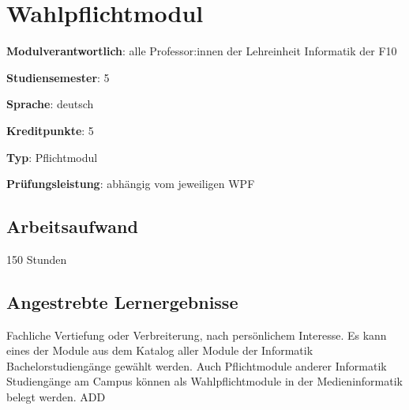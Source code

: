 \hypertarget{wahlpflichtmodulpathlabelmi-2017modulbeschreibungen-bachelorba_wpf}{%
\chapter{Wahlpflichtmodul\label{/mi-2017/modulbeschreibungen-bachelor/BA_WPF}}\label{wahlpflichtmodulpathlabelmi-2017modulbeschreibungen-bachelorba_wpf}}

\begin{modulHead}
\textbf{Modulverantwortlich}: alle Professor:innen
der Lehreinheit Informatik der
F10
\end{modulHead}
\begin{modulHead}
\textbf{Studiensemester}:
5
\end{modulHead}
\begin{modulHead}
\textbf{Sprache}:
deutsch
\end{modulHead}
\begin{modulHead}
\textbf{Kreditpunkte}:
5
\end{modulHead}
\begin{modulHead}
\textbf{Typ}:
Pflichtmodul
\end{modulHead}
\begin{modulHead}
\textbf{Prüfungsleistung}:
abhängig vom jeweiligen WPF
\end{modulHead}


\hypertarget{arbeitsaufwandpathlabelmi-2017modulbeschreibungen-bachelorba_wpf}{%
\section*{Arbeitsaufwand\label{/mi-2017/modulbeschreibungen-bachelor/BA_WPF}}\label{arbeitsaufwandpathlabelmi-2017modulbeschreibungen-bachelorba_wpf}}

150 Stunden

\hypertarget{angestrebte-lernergebnissepathlabelmi-2017modulbeschreibungen-bachelorba_wpf}{%
\section*{Angestrebte
Lernergebnisse\label{/mi-2017/modulbeschreibungen-bachelor/BA_WPF}}\label{angestrebte-lernergebnissepathlabelmi-2017modulbeschreibungen-bachelorba_wpf}}

Fachliche Vertiefung oder Verbreiterung, nach persönlichem Interesse. Es
kann eines der Module aus dem Katalog aller Module der Informatik
Bachelorstudiengänge gewählt werden. Auch Pflichtmodule anderer
Informatik Studiengänge am Campus können als Wahlpflichtmodule in der
Medieninformatik belegt werden. ADD
